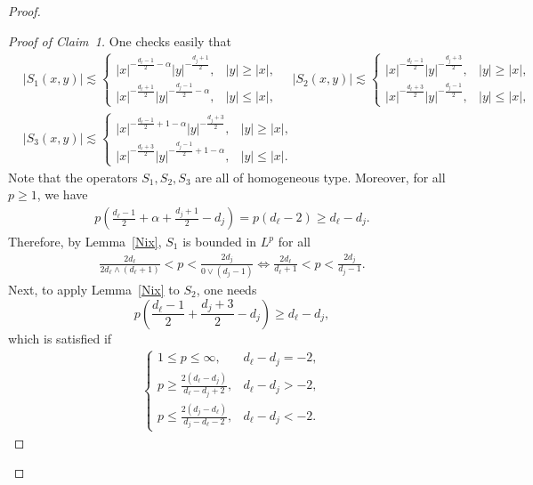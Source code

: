 \documentclass[12pt]{amsart}
\begin{document}
\begin{proof}
\begin{proof}[Proof of Claim~1]
One checks easily that 
\begin{align*}
&|S_1(x,y)| \lesssim \begin{cases}
        |x|^{-\frac{d_\ell-1}{2}-\alpha} |y|^{-\frac{d_j+1}{2}}, & |y| \ge |x|,\\
        |x|^{-\frac{d_\ell+1}{2}} |y|^{-\frac{d_j-1}{2}-\alpha}, & |y|\le |x|,
    \end{cases} \quad     |S_2(x,y)| \lesssim \begin{cases}
        |x|^{-\frac{d_\ell-1}{2}} |y|^{-\frac{d_j+3}{2}}, & |y| \ge |x|,\\
        |x|^{-\frac{d_\ell+3}{2}} |y|^{-\frac{d_j-1}{2}}, & |y|\le |x|,
    \end{cases}\\
    &|S_3(x,y)| \lesssim \begin{cases}
        |x|^{-\frac{d_\ell-1}{2}+1-\alpha} |y|^{-\frac{d_j+3}{2}}, & |y| \ge |x|,\\
        |x|^{-\frac{d_\ell+3}{2}} |y|^{-\frac{d_j-1}{2}+1-\alpha}, & |y|\le |x|.
    \end{cases}
\end{align*}
Note that the  operators $S_1,S_2,S_3$ are all of homogeneous type. Moreover, for all $p\ge 1$, we have
\begin{align*}
    p \left(\frac{d_\ell-1}{2} + \alpha + \frac{d_j+1}{2} - d_j \right) = p (d_\ell-2) \ge d_\ell-d_j.
\end{align*}
Therefore, by Lemma~\ref{Nix}, $S_1$ is bounded in $L^p$ for all
\begin{align}\label{S1}
    \frac{2d_\ell}{2d_\ell \wedge (d_\ell+1)} < p < \frac{2d_j}{0 \vee (d_j-1)} \iff \frac{2d_\ell}{d_\ell+1} < p < \frac{2d_j}{d_j-1}.
\end{align}
Next, to apply Lemma~\ref{Nix} to $S_2$, one needs
\begin{equation*}
    p\left( \frac{d_\ell-1}{2} + \frac{d_j+3}{2} - d_j \right) \ge d_\ell-d_j,
\end{equation*}
which is satisfied if
\begin{align*}
    \begin{cases}
        1\le p \le \infty, & d_\ell-d_j=-2, \\
        p\ge \frac{2(d_\ell-d_j)}{d_\ell-d_j+2}, & d_\ell-d_j>-2,\\
        p \le \frac{2(d_j-d_\ell)}{d_j-d_\ell-2}, & d_\ell-d_j<-2.
    \end{cases}
\end{align*}

\end{proof}
\end{proof}
\end{document}
